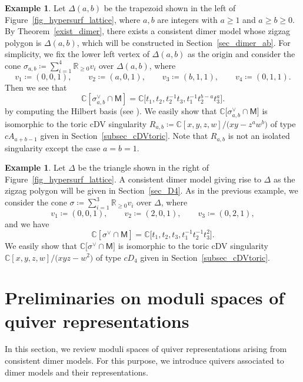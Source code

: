 \documentclass[pdftex]{sigma}
\numberwithin{equation}{section}
\theoremstyle{definition}
\newtheorem{Example}[Theorem]{Example}
\newcommand{\RR}{\mathbb{R}}
\newcommand{\CC}{\mathbb{C}}
\newcommand{\sfM}{\mathsf{M}}
\begin{document}
\begin{Example}
\label{ex_toric1}
Let $\Delta(a,b)$ be the trapezoid shown in the left of Figure~\ref{fig_hypersurf_lattice}, where $a, b$ are integers with $a\ge 1$ and $a\ge b\ge0$.
By Theorem~\ref{exist_dimer}, there exists a consistent dimer model whose zigzag polygon is $\Delta(a,b)$, which will be constructed in Section~\ref{sec_dimer_ab}.
For simplicity, we fix the lower left vertex of $\Delta(a,b)$ as the origin and consider the cone $\sigma_{a,b}\coloneqq \sum_{i=1}^4\RR_{\ge0} v_i$ over $\Delta(a,b)$, where
\[
v_1\coloneqq (0,0,1), \qquad v_2\coloneqq (a,0,1), \qquad v_3\coloneqq (b,1,1), \qquad v_4\coloneqq (0,1,1).
\]
Then we see that
\[
\CC[\sigma_{a,b}^\vee\cap\sfM]=\CC\bigr[t_1, t_2, t_2^{-1}t_3, t_1^{-1}t_2^{b-a}t_3^a\bigl].
\]
by computing the Hilbert basis (see \cite[Proposition~1.2.23]{CLS}).
We easily show that $\CC\bigl[\sigma_{a,b}^\vee\cap\sfM\bigr]$ is isomorphic to the toric cDV singularity
$R_{a,b}\coloneqq \CC[x,y,z,w]/\bigl(xy-z^aw^b\bigr)$ of type $cA_{a+b-1}$ given in Section~\ref{subsec_cDVtoric}.
Note that $R_{a,b}$ is not an isolated singularity except the case $a=b=1$.
\end{Example}

\begin{Example}\label{ex_toric2}
Let $\Delta$ be the triangle shown in the right of Figure~\ref{fig_hypersurf_lattice}.
A consistent dimer model giving rise to $\Delta$ as the zigzag polygon will be given in Section~\ref{sec_D4}.
As in the previous example, we consider the cone $\sigma\coloneqq \sum_{i=1}^3\RR_{\ge0} v_i$ over $\Delta$, where
\[
v_1\coloneqq (0,0,1), \qquad v_2\coloneqq (2,0,1), \qquad v_3\coloneqq (0,2,1),
\]
and we have
\[
\CC[\sigma^\vee\cap\sfM]=\CC\bigl[t_1, t_2, t_3, t_1^{-1}t_2^{-1}t_3^2\bigr].
\]
We easily show that $\CC\bigl[\sigma^\vee\cap\sfM\bigr]$ is isomorphic to the toric cDV singularity
$\CC[x,y,z,w]/\bigl(xyz-w^2\bigr)$ of type $cD_4$ given in Section~\ref{subsec_cDVtoric}.
\end{Example}

\section{Preliminaries on moduli spaces of quiver representations}\label{sec_quiver_rep}

In this section, we review moduli spaces of quiver representations arising from consistent dimer models.
For this purpose, we introduce quivers associated to dimer models and their representations.
\end{document}
